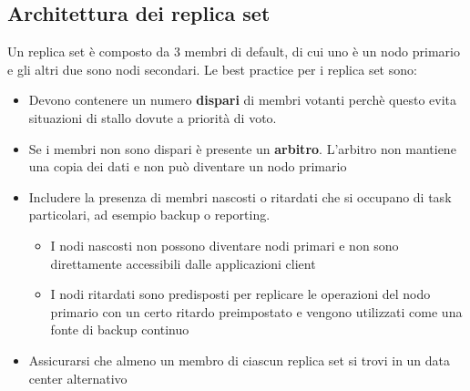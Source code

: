 \documentclass[a4paper]{article}
\begin{document}
\subsection{Architettura dei replica set}
Un replica set è composto da 3 membri di default, di cui uno è un nodo primario e gli
altri due sono nodi secondari. Le best practice per i replica set sono:
\begin{itemize}
  \item Devono contenere un numero \textbf{dispari} di membri votanti perchè questo evita situazioni di stallo
    dovute a priorità di voto.

  \item Se i membri non sono dispari è presente un \textbf{arbitro}. L'arbitro
    non mantiene una copia dei dati e non può diventare un nodo primario

  \item Includere la presenza di membri nascosti o ritardati che si occupano di
    task particolari, ad esempio backup o reporting.
    \begin{itemize}
      \item I nodi nascosti non
        possono diventare nodi primari e non sono direttamente accessibili dalle applicazioni
        client

      \item I nodi ritardati sono predisposti per replicare le operazioni del nodo
        primario con un certo ritardo preimpostato e vengono utilizzati come una
        fonte di backup continuo
    \end{itemize}


  \item Assicurarsi che almeno un membro di ciascun replica set si trovi in un data
    center alternativo
\end{itemize}
\end{document}
